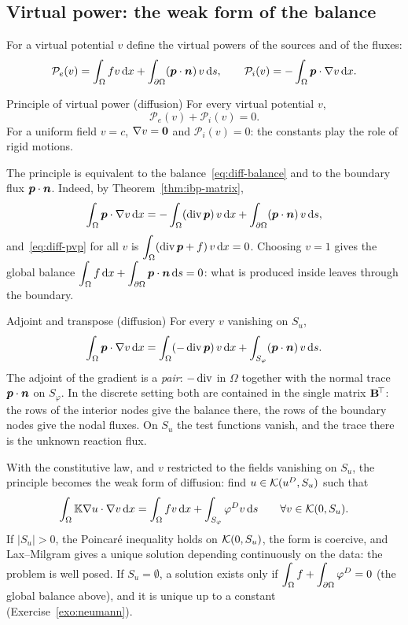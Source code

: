 \subsection{Virtual power: the weak form of the balance}
%
For a virtual potential $v$ define the virtual powers of the sources and of
the fluxes:
\[
  \mathcal P_e(v)=\int_\Omega fv\,\mathrm{d} x+\int_{\partial\Omega}(\bm{p}\cdot\bm{n})\,v\,\mathrm{d} s,\qquad
  \mathcal P_i(v)=-\int_\Omega\bm{p}\cdot\nabla v\,\mathrm{d} x .
\]
\begin{gbox}{Principle of virtual power (diffusion)}
For every virtual potential $v$,
\begin{equation}\label{eq:diff-pvp}
  \mathcal P_e(v)+\mathcal P_i(v)=0 .
\end{equation}
For a uniform field $v=c$, $\nabla v=\bm{0}$ and $\mathcal P_i(v)=0$: the
constants play the role of rigid motions.
\end{gbox}
The principle is equivalent to the balance~\eqref{eq:diff-balance} and to the
boundary flux $\bm{p}\cdot\bm{n}$. Indeed, by Theorem~\ref{thm:ibp-matrix},
\[
  \int_\Omega\bm{p}\cdot\nabla v\,\mathrm{d} x=-\int_\Omega(\operatorname{div}\bm{p})\,v\,\mathrm{d} x
  +\int_{\partial\Omega}(\bm{p}\cdot\bm{n})\,v\,\mathrm{d} s ,
\]
and~\eqref{eq:diff-pvp} for all $v$ is $\displaystyle \int_\Omega(\operatorname{div}\bm{p}+f)\,v\,\mathrm{d} x=0$.
Choosing $v=1$ gives the global balance $\displaystyle \int_\Omega f\,\mathrm{d} x+\int_{\partial\Omega}\bm{p}\cdot\bm{n}\,\mathrm{d} s=0$:
what is produced inside leaves through the boundary.

\begin{gbox}{Adjoint and transpose (diffusion)}
%
For every $v$ vanishing on $S_u$,
\[
  \int_\Omega\bm{p}\cdot\nabla v\,\mathrm{d} x=\int_\Omega(-\operatorname{div}\bm{p})\,v\,\mathrm{d} x
  +\int_{S_\varphi}(\bm{p}\cdot\bm{n})\,v\,\mathrm{d} s .
\]
The adjoint of the gradient is a \emph{pair}: $-\operatorname{div}$ in $\Omega$ together
with the normal trace $\bm{p}\cdot\bm{n}$ on $S_\varphi$. In the discrete setting
both are contained in the single matrix $\mathbf{B}^{\!\top}$: the rows of the interior
nodes give the balance there, the rows of the boundary nodes give the nodal
fluxes. On $S_u$ the test functions vanish, and the trace there is the
unknown reaction flux.
\end{gbox}

With the constitutive law, and $v$ restricted to the fields vanishing on
$S_u$, the principle becomes the weak form of diffusion: find
$u\in\mathcal{K}(u^{D},S_u)$ such that
\begin{equation}\label{eq:diffusion-weak}
  \int_\Omega\mathbb{K}\nabla u\cdot\nabla v\,\mathrm{d} x=\int_\Omega fv\,\mathrm{d} x
  +\int_{S_\varphi}\varphi^{D} v\,\mathrm{d} s\qquad\forall v\in\mathcal{K}(0,S_u).
\end{equation}
If $|S_u|>0$, the Poincar\'e inequality holds on $\mathcal{K}(0,S_u)$, the form is
coercive, and Lax--Milgram gives a unique solution depending continuously on
the data: the problem is well posed. If $S_u=\emptyset$, a solution exists only
if $\displaystyle \int_\Omega f+\int_{\partial\Omega}\varphi^{D}=0$ (the global balance above),
and it is unique up to a constant (Exercise~\ref{exo:neumann}).

